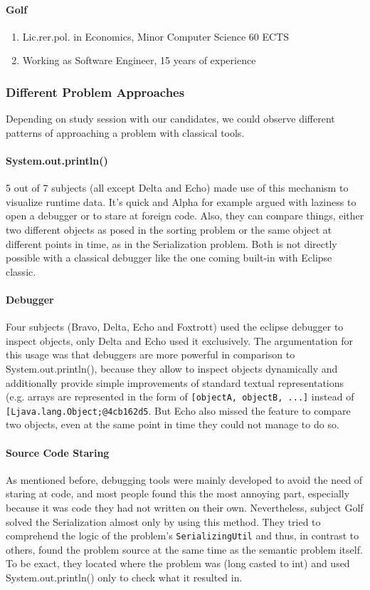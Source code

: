 \documentclass[english]{acm_proc_article-sp}
\begin{document}
\paragraph{Golf} %
\begin{enumerate}[$-$]
\item Lic.rer.pol. in Economics, Minor Computer Science 60 ECTS
\item Working as Software Engineer, 15 years of experience
\end{enumerate}

\subsubsection{Different Problem Approaches}
Depending on study session with our candidates, we could observe different patterns of approaching a problem with classical tools.
\paragraph{System.out.println()}
5 out of 7 subjects (all except Delta and Echo) made use of this mechanism to visualize runtime data. It's quick and Alpha for example argued with laziness to open a debugger or to stare at foreign code. Also, they can compare things, either two different objects as posed in the sorting problem or the same object at different points in time, as in the Serialization problem. Both is not directly possible with a classical debugger like the one coming built-in with Eclipse classic.
\paragraph{Debugger}
Four subjects (Bravo, Delta, Echo and Foxtrott) used the eclipse debugger to inspect objects, only Delta and Echo used it exclusively. The argumentation for this usage was that debuggers are more powerful in comparison to System.out.println(), because they allow to inspect objects dynamically and additionally provide simple improvements of standard textual representations (e.g. arrays are represented in the form of \verb-[objectA, objectB, ...]- instead of \verb-[Ljava.lang.Object;@4cb162d5-. But Echo also missed the feature to compare two objects, even at the same point in time they could not manage to do so.
\paragraph{Source Code Staring}
As mentioned before, debugging tools were mainly developed to avoid the need of staring at code, and most people found this the most annoying part, especially because it was code they had not written on their own. Nevertheless, subject Golf solved the Serialization almost only by using this method. They tried to comprehend the logic of the problem's \verb.SerializingUtil. and thus, in contrast to others, found the problem source at the same time as the semantic problem itself. To be exact, they located where the problem was (long casted to int) and used System.out.println() only to check what it resulted in.
\end{document}
